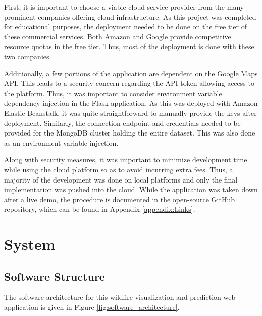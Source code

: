 \documentclass[conference]{IEEEtran}
\begin{document}
First, it is important to choose a viable cloud service provider from the many prominent companies offering cloud infrastructure. As this project was completed for educational purposes, the deployment needed to be done on the free tier of these commercial services. Both Amazon and Google provide competitive resource quotas in the free tier. Thus, most of the deployment is done with these two companies. \par

Additionally, a few portions of the application are dependent on the Google Maps API. This leads to a security concern regarding the API token allowing access to the platform. Thus, it was important to consider environment variable dependency injection in the Flask application. As this was deployed with Amazon Elastic Beanstalk, it was quite straightforward to manually provide the keys after deployment. Similarly, the connection endpoint and credentials needed to be provided for the MongoDB cluster holding the entire dataset. This was also done as an environment variable injection. \par

Along with security measures, it was important to minimize development time while using the cloud platform so as to avoid incurring extra fees. Thus, a majority of the development was done on local platforms and only the final implementation was pushed into the cloud. While the application was taken down after a live demo, the procedure is documented in the open-source GitHub repository, which can be found in Appendix \ref{appendix:Links}.

\section{System}
\subsection{Software Structure}
The software architecture for this wildfire visualization and prediction web application is given in Figure \ref{fig:software_architecture}.
\end{document}
